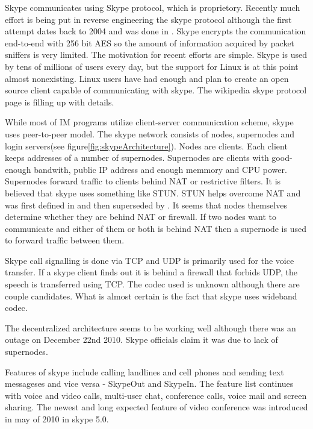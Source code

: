 Skype communicates using Skype protocol, which is proprietory. Recently much effort is being put in reverse engineering the skype protocol although the first attempt dates back to 2004 and was done in \cite{skypeProtocolAnalysis}. Skype encrypts the communication end-to-end with 256 bit AES so the amount of information acquired by packet sniffers is very limited. The motivation for recent efforts are simple. Skype is used by tens of millions of users every day, but the support for Linux is at this point almost nonexisting. Linux users have had enough and plan to create an open source client capable of communicating with skype. The wikipedia skype protocol page\cite{wikipediaSkypeProtocol} is filling up with details.  

While most of IM programs utilize client-server communication scheme, skype uses peer-to-peer model. The skype network consists of nodes, supernodes and login servers(see figure\ref{fig:skypeArchitecture}). Nodes are clients. Each client keeps addresses of a number of supernodes. Supernodes are clients with good-enough bandwith, public IP address and enough memmory and CPU power. Supernodes forward traffic to clients behind NAT or restrictive filters. It is believed that skype uses something like STUN. STUN helps overcome NAT and was first defined in \cite{STUNRFC} and then superseded by \cite{STUNRFCNEW}. It seems that nodes themselves determine whether they are behind NAT or firewall. If two nodes want to communicate and either of them or both is behind NAT then a supernode is used to forward traffic between them. 

Skype call signalling is done via TCP and UDP is primarily used for the voice transfer. If a skype client finds out it is behind a firewall that forbids UDP, the speech is transferred using TCP. The codec used is unknown although there are couple candidates. What is almost certain is the fact that skype uses wideband codec. 

The decentralized architecture seems to be working well although there was an outage on December 22nd 2010. Skype officials claim it was due to lack of supernodes\cite{skypeOutage}.  


Features of skype include calling landlines and cell phones and sending text messageses and vice versa - SkypeOut and SkypeIn. The feature list continues with voice and video calls, multi-user chat, conference calls, voice mail and screen sharing. The newest and long expected feature of video conference was introduced in may of 2010 in skype 5.0. 


